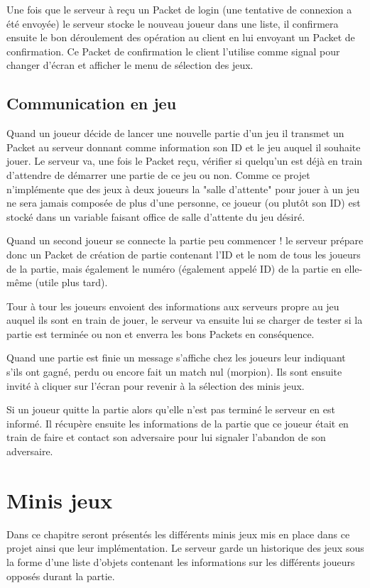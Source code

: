 \documentclass{report}
\begin{document}
Une fois que le serveur à reçu un Packet de login (une tentative de connexion a
été envoyée) le serveur stocke le nouveau joueur dans une liste, il confirmera ensuite le
bon déroulement des opération au client en lui envoyant un Packet de confirmation.
Ce Packet de confirmation le client l'utilise comme signal pour changer d'écran
et afficher le menu de sélection des jeux.

\section{Communication en jeu}

Quand un joueur décide de lancer une nouvelle partie d'un jeu il transmet un Packet au serveur donnant comme information son ID et le jeu
auquel il souhaite jouer. Le serveur va, une fois le Packet reçu, vérifier si quelqu'un est déjà en train d'attendre de démarrer une partie de ce jeu
ou non. Comme ce projet n'implémente que des jeux à deux joueurs la "salle d'attente" pour jouer à un jeu ne sera jamais composée de plus d'une personne,
ce joueur (ou plutôt son ID) est stocké dans un variable faisant office de salle d'attente du jeu désiré.

Quand un second joueur se connecte la partie peu commencer ! le serveur prépare donc un Packet de création de partie contenant l'ID et le nom de tous les
joueurs de la partie, mais également le numéro (également appelé ID) de la partie en elle-même (utile plus tard).

Tour à tour les joueurs envoient des informations aux serveurs propre au jeu auquel ils sont en train de jouer, le serveur va ensuite lui se charger de
tester si la partie est terminée ou non et enverra les bons Packets en conséquence.

Quand une partie est finie un message s'affiche chez les joueurs leur indiquant s'ils ont gagné, perdu ou encore fait un match nul (morpion). Ils sont
ensuite invité à cliquer sur l'écran pour revenir à la sélection des minis jeux.

Si un joueur quitte la partie alors qu'elle n'est pas terminé le serveur en est informé. Il récupère ensuite les informations de la partie que
ce joueur était en train de faire et contact son adversaire pour lui signaler l'abandon de son adversaire.

\chapter{Minis jeux}
Dans ce chapitre seront présentés les différents minis jeux mis en place dans
ce projet ainsi que leur implémentation.
Le serveur garde un historique des jeux sous la forme d'une liste d'objets
contenant les informations sur les différents joueurs opposés durant la partie.
\end{document}
